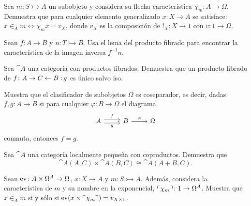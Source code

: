 \begin{exercise}[teca=1]
  Sea \(m\colon S\rightarrowtail A\) un subobjeto y considera su flecha
  característica \(\chi_m\colon A\to \Omega\). Demuestra que para
  cualquier elemento generalizado \(x\colon X\to A\) se satisface: \( x\in_A m \iff \chi_m x = v_X \), donde \(v_X\) es la composición de \(!_X\colon X\to 1\) con \(v\colon 1\to \Omega\).
\end{exercise}

\begin{exercise}
  Sean \(f\colon A\to B\) y \(n\colon T\rightarrowtail B\). Usa el lema
  del producto fibrado para encontrar la característica de la imagen
  inversa \(f^{-1}n\).
\end{exercise}


\begin{exercise}[par=2]
  Sea \(\cat{A}\) una categoría con productos fibrados. Demuestra que un
  producto fibrado de \(f\colon A\to C\leftarrow B\noloc g\) es
  único salvo iso.
\end{exercise}

\begin{exercise}[par=2, teca=2]
  Muestra que el clasificador de subobjetos \(\Omega\) es coseparador, es
  decir, dadas \(f,g\colon A\to B\) si para cualquier 
  \(\varphi\colon B\to\Omega\) el diagrama
  \begin{equation*}
    \begin{tikzcd}[ampersand replacement=\&]
      A\ar[shift left]{r}{f}\ar[shift right]{r}[swap]{g}\& B\ar{r}{\varphi}\& \Omega      
    \end{tikzcd}
  \end{equation*}
  conmuta, entonces \(f = g\).
\end{exercise}

\begin{exercise}[par=2]
  Sea \(\cat{A}\) una categoría localmente pequeña con coproductos. Demuestra que
  \begin{equation*}
    \cat{A}(A,C)\times\cat{A}(B,C)\cong\cat{A}(A+B,C).
  \end{equation*}
\end{exercise}

\begin{exercise}[par=2]
  Sean \(\mathrm{ev}\colon A\times\Omega^A\to\Omega\), \(x\colon X\to A\) y 
  \(m\colon S\rightarrowtail A\). Además, considera la característica de \(m\) y
  su nombre en la exponencial, \(\ulcorner\chi_m\urcorner\colon 1\to\Omega^A\). Muestra que 
  \(x\in_A m\) si y sólo si \(\mathrm{ev}(x\times\ulcorner\chi_m\urcorner) = v_{X\times 1}\).
\end{exercise}

